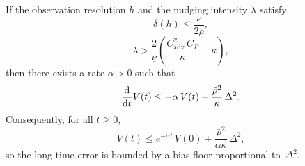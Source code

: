 \begin{theorem}
\medskip\noindent
If the observation resolution $h$ and the nudging intensity $\lambda$ satisfy
\begin{equation}\label{eq:h_condition}
\delta(h) \le \frac{\underline\nu}{2\bar\rho},
\end{equation}
\begin{equation}\label{eq:lambda_condition}
\lambda > \frac{2}{\underline\nu}
\left( \frac{C_{\mathrm{adv}}^2\,C_P}{\kappa} - \kappa \right),
\end{equation}
then there exists a rate $\alpha>0$ such that
\begin{equation}\label{eq:L2_decay}
\frac{\mathrm{d}}{\mathrm{d} t} V(t) \le -\alpha\,V(t) + \frac{\bar\rho^2}{\kappa}\,\Delta^2.
\end{equation}
Consequently, for all $t\ge 0$,
\begin{equation}\label{eq:L2_bound}
V(t) \le e^{-\alpha t}\,V(0) + \frac{\bar\rho^2}{\alpha\kappa}\,\Delta^2,
\end{equation}
so the long-time error is bounded by a bias floor proportional to~$\Delta^2$.
\end{theorem}
 


